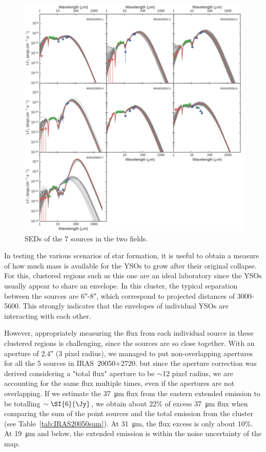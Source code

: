\begin{figure}
\begin{center}
\includegraphics[width=\textwidth]{Figures/IRAS20050_SEDs.jpg}
\caption[IRAS20050+2720 SEDs]{SEDs of the 7 sources in the two fields. }
\label{fig:IRAS20050_SEDs}
\end{center}
\end{figure}


In testing the various scenarios of star formation, it is useful to obtain a measure of how much mass is available for the YSOs to grow after their original collapse. For this, clustered regions such as this one are an ideal laboratory since the YSOs usually appear to share an envelope. In this cluster, the typical separation between the sources are \ang{;;6}-\ang{;;8}, which correspond to projected distances of \num{3000}-\SI{5600}{\au}. This strongly indicates that the envelopes of individual YSOs are interacting with each other.


However, appropriately measuring the flux from each individual source in these clustered regions is challenging, since the sources are so close together. With an aperture of \ang{;;2.4} (3 pixel radius), we managed to put non-overlapping apertures for all the 5 sources in IRAS~20050+2720. but since the aperture correction was derived considering a "total flux" aperture to be $\sim$12 pixel radius, we are accounting for the same flux multiple times, even if the apertures are not overlapping. If we estimate the \SI{37}{\um} flux from the eastern extended emission to be totalling $\sim\SI{6}{\Jy}$, we obtain about 22\% of excess \SI{37}{\um} flux when comparing the sum of the point sources and the total emission from the cluster (see Table~\ref{tab:IRAS20050sum}). At \SI{31}{\um}, the flux excess is only about 10\%. At \SI{19}{\um} and below, the extended emission is within the noise uncertainty of the map. 

